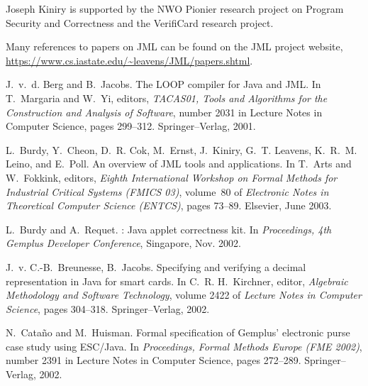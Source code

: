 \documentclass{sig-alternate}
\begin{document}
Joseph Kiniry is supported by the NWO Pionier research
project on Program Security and Correctness and the VerifiCard
research project. 


%

%  

\begin{thebibliography}{10}

Many references to papers on JML can be found on the JML project website,
  \url{https://www.cs.iastate.edu/~leavens/JML/papers.shtml}.

J.~v.~d. Berg and B.~Jacobs.
\newblock The {LOOP} compiler for {Java} and {JML}.
\newblock In T.~Margaria and W.~Yi, editors, {\em {TACAS01}, Tools and
  Algorithms for the Construction and Analysis of Software}, number 2031 in
  Lecture Notes in Computer Science, pages 299--312. Springer--Verlag, 2001.

L.~Burdy, Y.~Cheon, D.~R. Cok, M.~Ernst, J.~Kiniry, G.~T. Leavens, K.~R.~M.
  Leino, and E.~Poll.
\newblock An overview of {JML} tools and applications.
\newblock In T.~Arts and W.~Fokkink, editors, {\em Eighth International
  Workshop on Formal Methods for Industrial Critical Systems (FMICS 03)},
  volume~80 of {\em Electronic Notes in Theoretical Computer Science (ENTCS)},
  pages 73--89. Elsevier, June 2003.

L.~Burdy and A.~Requet.
: Java applet correctness kit.
\newblock In {\em Proceedings, 4th Gemplus Developer Conference}, Singapore,
  Nov. 2002.

J.~v. C.-B.~Breunesse, B.~Jacobs.
\newblock Specifying and verifying a decimal representation in {Java} for smart
  cards.
\newblock In C.~R. H.~Kirchner, editor, {\em Algebraic Methodology and Software
  Technology}, volume 2422 of {\em Lecture Notes in Computer Science}, pages
  304--318. Springer--Verlag, 2002.

N.~Cata{\~n}o and M.~Huisman.
\newblock Formal specification of {Gemplus'} electronic purse case study using
  {ESC/Java}.
\newblock In {\em Proceedings, Formal Methods Europe ({FME} 2002)}, number 2391
  in Lecture Notes in Computer Science, pages 272--289. Springer--Verlag, 2002.


\end{thebibliography}
\end{document}
